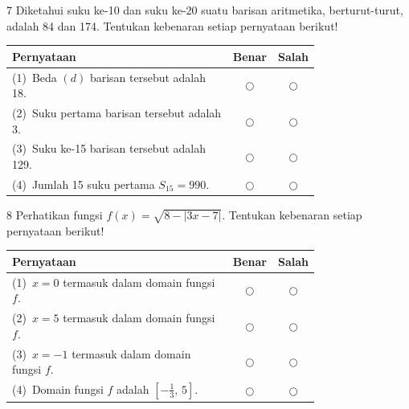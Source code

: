 \documentclass[11pt]{article}
\begin{document}
\begin{soal}{7}
Diketahui suku ke-10 dan suku ke-20 suatu barisan aritmetika,
berturut-turut, adalah 84 dan 174.
Tentukan kebenaran setiap pernyataan berikut!

\par\smallskip
{\renewcommand{\arraystretch}{1.4}%
\begin{tabular}{@{}p{0.76\linewidth}cc@{}}
\hline
\textbf{Pernyataan} & \textbf{Benar} & \textbf{Salah}\\
\hline
(1)~Beda $(d)$ barisan tersebut adalah 18.
  & $\bigcirc$ & $\bigcirc$\\
(2)~Suku pertama barisan tersebut adalah 3.
  & $\bigcirc$ & $\bigcirc$\\
(3)~Suku ke-15 barisan tersebut adalah 129.
  & $\bigcirc$ & $\bigcirc$\\
(4)~Jumlah 15 suku pertama $S_{15}=990$.
  & $\bigcirc$ & $\bigcirc$\\
\hline
\end{tabular}}
\end{soal}

\begin{soal}{8}
Perhatikan fungsi $f(x)=\sqrt{8-|3x-7|}$.
Tentukan kebenaran setiap pernyataan berikut!

\par\smallskip
{\renewcommand{\arraystretch}{1.4}%
\begin{tabular}{@{}p{0.76\linewidth}cc@{}}
\hline
\textbf{Pernyataan} & \textbf{Benar} & \textbf{Salah}\\
\hline
(1)~$x=0$ termasuk dalam domain fungsi $f$.
  & $\bigcirc$ & $\bigcirc$\\
(2)~$x=5$ termasuk dalam domain fungsi $f$.
  & $\bigcirc$ & $\bigcirc$\\
(3)~$x=-1$ termasuk dalam domain fungsi $f$.
  & $\bigcirc$ & $\bigcirc$\\
(4)~Domain fungsi $f$ adalah $\left[-\tfrac{1}{3},\,5\right]$.
  & $\bigcirc$ & $\bigcirc$\\
\hline
\end{tabular}}
\end{soal}
\end{document}
